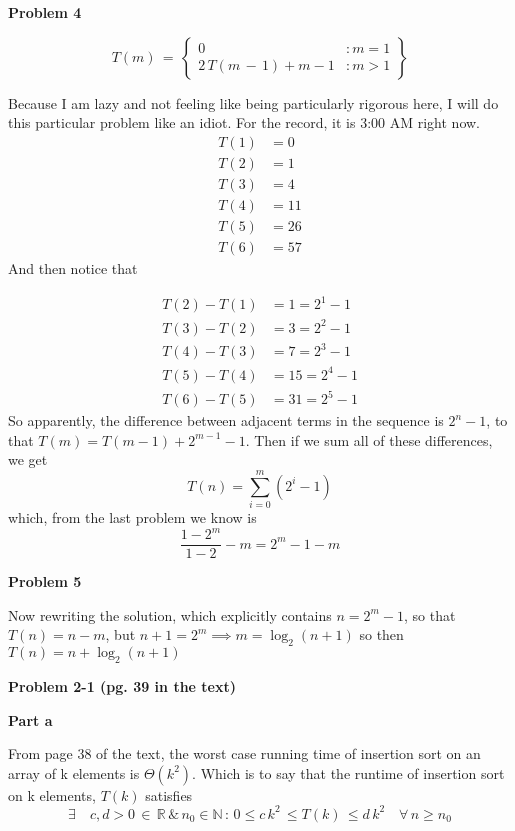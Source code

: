 \documentclass{article}
\begin{document}
  \newpage
  \noindent \textbf{Problem 4}

  $$
    T(m) \, = \, \left\{
    \begin{array}{lr}
      0 &: m = 1 \\
      2 \,T(m\,-\,1)+ m - 1 &: m > 1
    \end{array}
    \right\}
  $$

  Because I am lazy and not feeling like being particularly rigorous here, I will do this particular problem like an idiot.
  For the record, it is 3:00 AM right now.
  \begin{equation}
    \begin{split}
      T(1) & = 0 \\
      T(2) & = 1 \\
      T(3) & = 4 \\
      T(4) & = 11 \\
      T(5) & = 26 \\
      T(6) & = 57
    \end{split}
  \end{equation}
  And then notice that

  \begin{equation}
    \begin{split}
      T(2) - T(1) & = 1 = 2^1 - 1 \\
      T(3) - T(2) & = 3 = 2^2 - 1 \\
      T(4) - T(3) & = 7 = 2^3 - 1 \\
      T(5) - T(4) & = 15 = 2^4 - 1\\
      T(6) - T(5) & = 31 = 2^5 - 1
    \end{split}
  \end{equation}
  So apparently, the difference between adjacent terms in the sequence is
  $ 2^n - 1$, to that $T(m) = T(m-1) + 2^{m-1} - 1$.
  Then if we sum all of these differences, we get
  $$ T(n) = \sum_{i=0}^{m} (2^{i} - 1)$$
  which, from the last problem we know is
  $$ \frac{1 - 2^m}{1-2} - m = 2^m - 1 - m$$

  \noindent \textbf{Problem 5}

  Now rewriting the solution, which explicitly contains $n = 2^m -1$, so that $T(n) = n  - m$, but $n+1 = 2^m \implies m = \log_{2}(n+1)$ so then $T(n) = n + \log_{2}(n+1)$


  \noindent \textbf{Problem 2-1 (pg. 39 in the text)}

  \textbf{Part a}

    From page 38 of the text, the worst case running time of insertion sort on
    an array of k elements is $\Theta(k^2)$.
    Which is to say that the runtime of insertion sort on k elements, $T(k)$ satisfies
    \begin{equation}
      \exists \quad c,d  > 0\, \in\, \mathbb{R}\, \& \, n_0 \in \mathbb{N} \, : \, 0 \leq c \, k^2  \, \leq T(k) \, \leq d \, k^2 \quad \forall \, n \geq n_0
    \end{equation}
\end{document}

